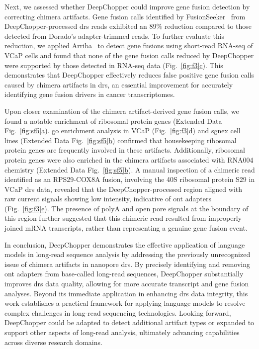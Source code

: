 \documentclass[pdflatex,sn-nature, lineno]{sn-jnl}%
\newcommand{\figref}[2]{Fig.~\hyperref[#1]{\ref*{#1}#2}}
\newcommand{\edfigref}[2]{Extended Data Fig.~\hyperref[#1]{\ref*{#1}#2}}
\begin{document}
Next, we assessed whether DeepChopper could improve gene fusion detection by correcting chimera artifacts. Gene fusion calls identified by FusionSeeker~\cite{chen2023gene} from DeepChopper-processed \gls{drs} reads exhibited an 89\% reduction compared to those detected from Dorado's adapter-trimmed reads.
To further evaluate this reduction, we applied Arriba~\cite{uhrig2021accurate} to detect gene fusions using short-read RNA-seq of VCaP cells and found that none of the gene fusion calls reduced by DeepChopper were supported by those detected in RNA-seq data (\figref{fig:f3}{c}).
This demonstrates that DeepChopper effectively reduces false positive gene fusion calls caused by chimera artifacts in \gls{drs}, an essential improvement for accurately identifying gene fusion drivers in cancer transcriptomes.

Upon closer examination of the chimera artifact-derived gene fusion calls, we found a notable enrichment of ribosomal protein genes (\edfigref{fig:sf5}{a}).
\gls{go} enrichment analysis in VCaP (\figref{fig:f3}{d}) and \gls{sgnex} cell lines (\edfigref{fig:sf5}{b}) confirmed that housekeeping ribosomal protein genes are frequently involved in these artifacts.
Additionally, ribosomal protein genes were also enriched in the chimera artifacts associated with RNA004 chemistry (\edfigref{fig:sf5}{b}).
A manual inspection of a chimeric read identified as an RPS29-COX8A fusion, involving the 40S ribosomal protein S29 in VCaP \gls{drs} data, revealed that the DeepChopper-processed region aligned with raw current signals showing low intensity, indicative of \gls{ont} adapters (\figref{fig:f3}{e}).
The presence of polyA and open pore signals at the boundary of this region further suggested that this chimeric read resulted from improperly joined mRNA transcripts, rather than representing a genuine gene fusion event.

In conclusion, DeepChopper demonstrates the effective application of language models in long-read sequence analysis by addressing the previously unrecognized issue of chimera artifacts in nanopore \gls{drs}. By precisely identifying and removing \gls{ont} adapters from base-called long-read sequences, DeepChopper substantially improves \gls{drs} data quality, allowing for more accurate transcript and gene fusion analyses. Beyond its immediate application in enhancing \gls{drs} data integrity, this work establishes a practical framework for applying language models to resolve complex challenges in long-read sequencing technologies. Looking forward, DeepChopper could be adapted to detect additional artifact types or expanded to support other aspects of long-read analysis, ultimately advancing capabilities across diverse research domains.
\end{document}
